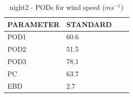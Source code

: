 \begin{table}[h!]
\begin{center}
\begin{tabular}{|l|l|l|l|}
\hline
\multicolumn{1}{|c|}{\cellcolor[HTML]{C0C0C0}\textbf{PARAMETER}} & \multicolumn{1}{c|}{\cellcolor[HTML]{C0C0C0}\textbf{STANDARD}} \\
\hline
\cellcolor[HTML]{C0C0C0}POD1  & 60.6                                \\
\cellcolor[HTML]{C0C0C0}POD2  & 51.5                                \\
\cellcolor[HTML]{C0C0C0}POD3  & 78.1                                \\
\cellcolor[HTML]{C0C0C0}PC    & 63.7                                  \\
\cellcolor[HTML]{C0C0C0}EBD   & 2.7                                 \\
\hline
\end{tabular}
\caption{night2 - PODs for wind speed ($m s^{-1}$)}
\label{tab:podws:night2}
\end{center}
\end{table}
